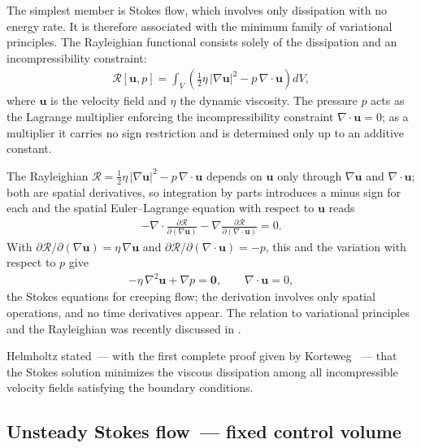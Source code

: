 \documentclass[aip,pof,reprint,amsmath,amssymb,longbibliography]{revtex4-2}
\begin{document}
The simplest member is Stokes flow, which involves only dissipation with no energy rate. It is therefore associated with the minimum family of variational principles. The Rayleighian functional consists solely of the dissipation and an incompressibility constraint:
\begin{align}
    \mathcal{R}[\boldsymbol{u}, p] = \int_V \left( \frac{1}{2}\eta\,|\nabla \boldsymbol{u}|^2 - p\,\nabla \cdot \boldsymbol{u} \right) dV, \label{eq:stokes_L}
\end{align}
where $\boldsymbol{u}$ is the velocity field and $\eta$ the dynamic viscosity. The pressure $p$ acts as the Lagrange multiplier enforcing the incompressibility constraint $\nabla \cdot \boldsymbol{u} = 0$; as a multiplier it carries no sign restriction and is determined only up to an additive constant.

The Rayleighian $\mathscr{R} = \frac{1}{2}\eta\,|\nabla \boldsymbol{u}|^2 - p\,\nabla \cdot \boldsymbol{u}$ depends on $\boldsymbol{u}$ only through $\nabla \boldsymbol{u}$ and $\nabla \cdot \boldsymbol{u}$; both are spatial derivatives, so integration by parts introduces a minus sign for each and the spatial Euler--Lagrange equation with respect to $\boldsymbol{u}$ reads
\begin{align}
    -\nabla \cdot \frac{\partial \mathscr{R}}{\partial (\nabla \boldsymbol{u})} - \nabla \frac{\partial \mathscr{R}}{\partial (\nabla \cdot \boldsymbol{u})} = 0. \label{eq:stokes_EL}
\end{align}
With $\partial \mathscr{R}/\partial (\nabla \boldsymbol{u}) = \eta\,\nabla \boldsymbol{u}$ and $\partial \mathscr{R}/\partial (\nabla \cdot \boldsymbol{u}) = -p$, this and the variation with respect to $p$ give
\begin{align}
    -\eta\,\nabla^2 \boldsymbol{u} + \nabla p = \boldsymbol{0}, \qquad \nabla \cdot \boldsymbol{u} = 0, \label{eq:stokes}
\end{align}
the Stokes equations for creeping flow; the derivation involves only spatial operations, and no time derivatives appear. The relation to variational principles and the Rayleighian was recently discussed in \cite{beris2024}.

Helmholtz \cite{helmholtz1868} stated~--- with the first complete proof given by Korteweg \cite{korteweg1883}~--- that the Stokes solution minimizes the viscous dissipation among all incompressible velocity fields satisfying the boundary conditions.

\subsection{Unsteady Stokes flow~--- fixed control volume}
\label{sec:ustokes}
\end{document}

